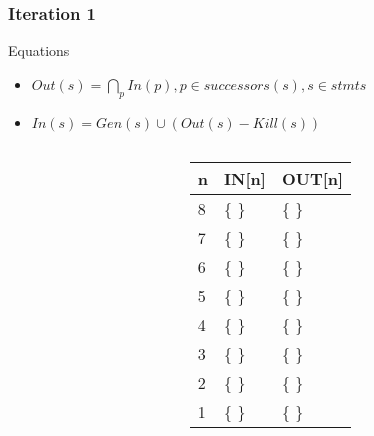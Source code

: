 \begin{frame}[fragile, t]
 \frametitle{Iteration 1} 

\begin{center}
\begin{scriptsize}
\begin{minipage}{8cm}
    \begin{block}{Equations}
    \begin{itemize}
        \item $Out(s) = \bigcap_p In(p), p \in successors(s), s \in stmts$
	    \item $In(s) = Gen(s) \cup (Out(s) - Kill(s))$  
    \end{itemize}
    \end{block}
\end{minipage}
\end{scriptsize}
\end{center}

\begin{columns}[T]
\begin{column}[T]{.5\textwidth}
    \vspace{0pt}
    
    \end{column}
    \begin{column}[T]{.5\textwidth}
\vspace{30pt}    
	\begin{scriptsize}
	   \begin{table}[]
\begin{tabular}{|l|l|l|}
\hline
n & IN{[}n{]} & OUT{[}n{]} \\ \hline
8  & \{ \} & \{ \} \pause \\ \hline
7  & \{ \} & \{ \} \pause \\ \hline
6  & \{ \} & \{ \} \pause \\ \hline
5  & \{ \} & \{ \} \pause \\ \hline
4  & \{ \} & \{ \} \pause \\ \hline
3  & \{ \} & \{ \} \pause \\ \hline
2  & \{ \} & \{ \} \pause \\ \hline
1  & \{ \} & \{ \} \pause \\ \hline
\end{tabular}
\end{table}   
	\end{scriptsize}
	\end{column}
    
\end{columns}

\end{frame}

